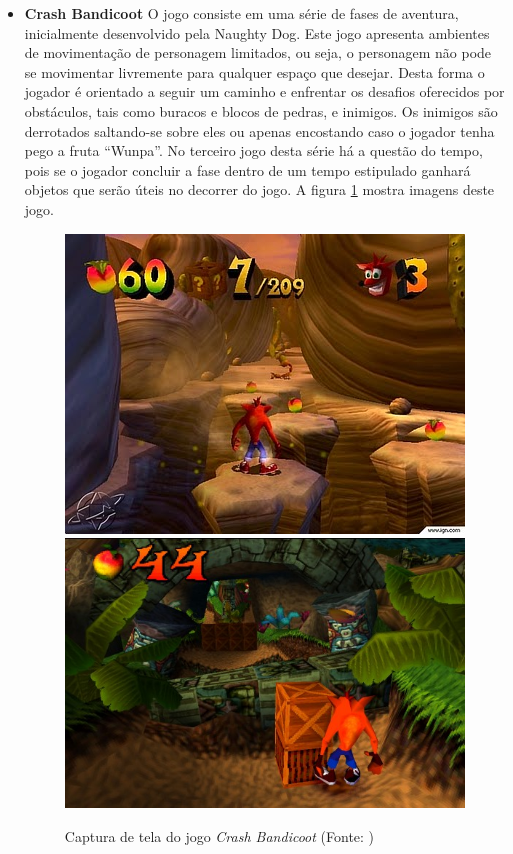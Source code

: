 \begin{itemize}
\item {\bf Crash Bandicoot\cite{bib:crash_game}}
O jogo consiste 
em uma série de fases de aventura, inicialmente desenvolvido pela Naughty Dog.
Este jogo apresenta ambientes de movimentação de personagem limitados, ou seja, 
o personagem não pode se movimentar livremente para qualquer espaço que desejar.
 Desta forma o jogador é orientado a seguir um caminho e enfrentar os desafios 
oferecidos por obstáculos, tais como buracos e blocos de pedras, e inimigos.
Os inimigos são derrotados saltando-se sobre eles ou apenas encostando caso o jogador tenha pego a fruta ``Wunpa''.
No terceiro jogo desta série há a questão do tempo, pois se o jogador concluir a fase
 dentro de um tempo estipulado ganhará objetos que serão úteis no decorrer do jogo. A figura \ref{img:crash} mostra imagens deste jogo.

\begin{figure}[!ht]
 \centering
 \includegraphics[scale=0.705]{Imagens/crash1.png}
 \includegraphics[scale=0.57]{Imagens/crash2.png}
 \caption{Captura de tela do jogo \textit{Crash Bandicoot}
(Fonte: \cite{bib:crash01,bib:crash02})}
 \label{img:crash}
\end{figure}


\end{itemize}
